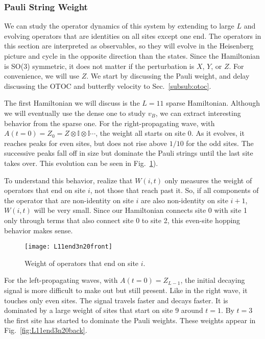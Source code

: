 \subsubsection{Pauli String Weight} \label{subsub:pauli}  

We can study the operator dynamics of this system by extending to large $L$ and evolving operators that are identities on all sites except one end. The operators in this section are interpreted as observables, so they will evolve in the Heisenberg picture and cycle in the opposite direction than the states. Since the Hamiltonian is SO(3) symmetric, it does not matter if the perturbation is $X$, $Y$, or $Z$. For convenience, we will use $Z$. We start by discussing the Pauli weight, and delay discussing the OTOC and butterfly velocity to Sec.~\ref{subsub:otoc}.

The first Hamiltonian we will discuss is the $L=11$ sparse Hamiltonian. Although we will eventually use the dense one to study $v_B$, we can extract interesting behavior from the sparse one.
For the right-propagating wave, with $A(t=0) = Z_0 = Z\otimes \mathbb{I} \otimes \mathbb{I} \cdots$, the weight all starts on site 0. As it evolves, it reaches peaks for even sites, but does not rise above $1/10$ for the odd sites. The successive peaks fall off in size but dominate the Pauli strings until the last site takes over. This evolution can be seen in Fig.~\ref{fig:L11end3n20front}). 

To understand this behavior, realize that $W(i,t)$ only measures the weight of operators that end on site $i$, not those that reach past it. So, if all components of the operator that are non-identity on site $i$ are also non-identity on site $i+1$, $W(i,t)$ will be very small. Since our Hamiltonian connects site 0 with site 1 only through terms that also connect site 0 to site 2, this even-site hopping behavior makes sense. 

\begin{figure}
	\centering
	\texttt{[image: L11end3n20front]}
	\caption{Weight of operators that end on site $i$.}
	\label{fig:L11end3n20front}
\end{figure}

For the left-propagating waves, with $A(t=0)=Z_{L-1}$, the initial decaying signal is more difficult to make out but still present. Like in the right wave, it touches only even sites. The signal travels faster and decays faster. It is dominated by a large weight of sites that start on site 9 around $t=1$. By $t = 3$ the first site has started to dominate the Pauli weights. These weights appear in Fig.~\ref{fig:L11end3n20back}.

